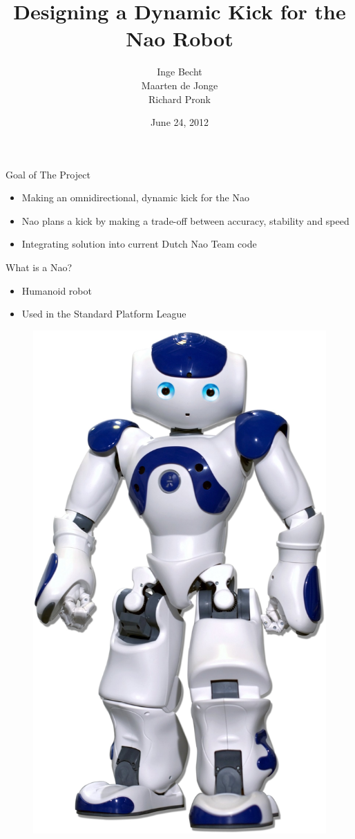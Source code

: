 \documentclass{beamer}
\title[Dynamically kicking balls]{Designing a Dynamic Kick for the Nao Robot}
\author{Inge Becht\\ Maarten de Jonge\\ Richard Pronk}
\institute{University of Amsterdam}
\date{June 24, 2012}
\begin{document}
\begin{frame}
\titlepage
\end{frame}

\begin{frame}{Goal of The Project}
    \begin{itemize}
        \item{Making an omnidirectional, dynamic kick for the Nao}
        \item{Nao plans a kick by making a trade-off between
             accuracy, stability and speed}
        \item{Integrating solution into current Dutch Nao Team code}
    \end{itemize}
\end{frame}

\begin{frame}{What is a Nao?}
    \begin{itemize}
        \item{Humanoid robot}
        \item{Used in the Standard Platform League}
    \end{itemize}
     \begin{figure}[H] 
        \begin{center}
            \includegraphics[scale=0.2]{nao.jpg}

\end{center}
\end{figure}
\end{frame}
\end{document}
